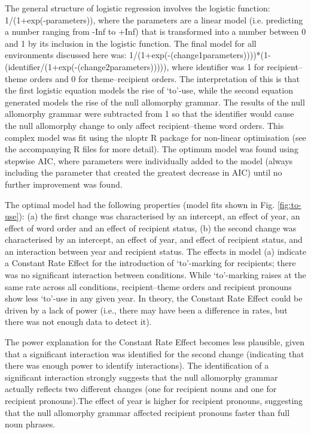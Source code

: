 	The general structure of logistic regression involves the logistic function: 1/(1+exp(-parameters)), where the parameters are a linear model (i.e. predicting a number ranging from -Inf to +Inf) that is transformed into a number between 0 and 1 by its inclusion in the logistic function. The final model for all environments discussed here was: 1/(1+exp(-(change1parameters))))*(1-(identifier/(1+exp(-(change2parameters))))), where identifier was 1 for recipient--theme orders and 0 for theme--recipient orders. The interpretation of this is that the first logistic equation models the rise of `to'-use, while the second equation generated models the rise of the null allomorphy grammar. The results of the null allomorphy grammar were subtracted from 1 so that the identifier would cause the null allomorphy change to only affect recipient--theme word orders. This complex model was fit using the nloptr R package for non-linear optimisation (see the accompanying R files for more detail). The optimum model was found using stepwise AIC, where parameters were individually added to the model (always including the parameter that created the greatest decrease in AIC) until no further improvement was found.

	The optimal model had the following properties (model fits shown in Fig. \ref{fig:to-use}): (a) the first change was characterised by an intercept, an effect of year, an effect of word order and an effect of recipient status, (b) the second change was characterised by an intercept, an effect of year, and effect of recipient status, and an interaction between year and recipient status. The effects in model (a) indicate a Constant Rate Effect for the introduction of `to'-marking for recipients; there was no significant interaction between conditions. While `to'-marking raises at the same rate across all conditions, recipient--theme orders and recipient pronouns show less `to'-use in any given year. In theory, the Constant Rate Effect could be driven by a lack of power (i.e., there may have been a difference in rates, but there was not enough data to detect it).
	
	The power explanation for the Constant Rate Effect becomes less plausible, given that a significant interaction was identified for the second change (indicating that there was enough power to identify interactions). The identification of a significant interaction strongly suggests that the null allomorphy grammar actually reflects two different changes (one for recipient nouns and one for recipient pronouns).The effect of year is higher for recipient pronouns, suggesting that the null allomorphy grammar affected recipient pronouns faster than full noun phrases.
	

